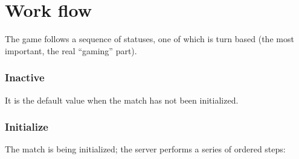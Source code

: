	\section{Work flow}
	\label{workflow:general}
		
		The game follows a sequence of statuses, one of which is turn based (the most important, the real “gaming” part).
	
		\subsubsection{Inactive}
		
			It is the default value when the match has not been initialized.
	
		\subsubsection{Initialize}
		
			The match is being initialized; the server performs a series of ordered steps:
			
